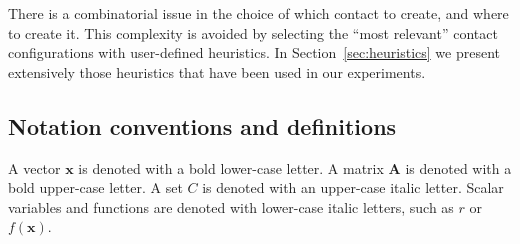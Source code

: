 There is a combinatorial issue in the choice of which contact to create,
and where to create it. This complexity is avoided by selecting the ``most relevant'' contact configurations with user-defined heuristics. In Section~\ref{sec:heuristics} we present extensively those heuristics that have been used in our experiments.



\subsection{Notation conventions and definitions} \label{notations}

A vector  $\mathbf{x}$ is denoted with a bold lower-case letter.
A matrix $\mathbf{A}$ is denoted with a bold upper-case letter.
A set $C$ is denoted with an upper-case italic letter.
Scalar variables and functions are denoted with lower-case italic letters, such as
$r$ or $f(\textbf{x})$.



